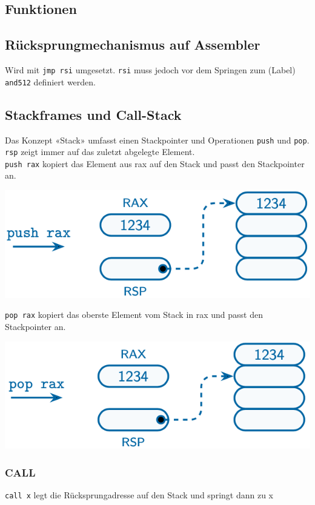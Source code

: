 \documentclass[8pt,landscape,a4paper]{scrartcl}
\begin{document}
\begin{multicols*}{5}
\section{Funktionen}
\subsection{Rücksprungmechanismus auf Assembler}
Wird mit \texttt{jmp rsi} umgesetzt. \texttt{rsi} muss jedoch vor dem Springen zum (Label) \texttt{and512} definiert werden.
\subsection{Stackframes und Call-Stack}
Das Konzept «Stack» umfasst einen Stackpointer und Operationen \texttt{push} und \texttt{pop}. \texttt{rsp} zeigt immer auf das zuletzt abgelegte Element.\\
\texttt{push rax} kopiert das Element aus rax auf den Stack und passt den Stackpointer an.
\begin{center}
	\includegraphics[scale=.35]{Graphic/Push}
\end{center} 
\texttt{pop rax} kopiert das oberste Element vom Stack in rax und passt den Stackpointer an.
\begin{center}
	\includegraphics[scale=.35]{Graphic/Pop}
\end{center}

\subsubsection{CALL}
\texttt{call x} legt die Rücksprungadresse auf den Stack und springt dann zu x

\end{multicols*}
\end{document}
